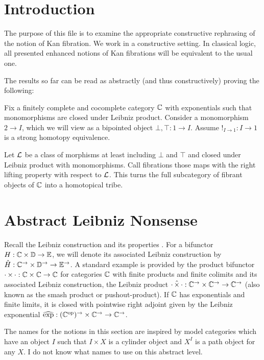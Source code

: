 \documentclass[reqno,10pt,a4paper,oneside]{amsart}
\begin{document}
\section{Introduction}

The purpose of this file is to examine the appropriate constructive rephrasing of the notion of Kan fibration.
We work in a constructive setting.
In classical logic, all presented enhanced notions of Kan fibrations will be equivalent to the usual one. 

The results so far can be read as abstractly (and thus constructively) proving the following:

\begin{theorem}
\label{abstract-homotopical-tribe}
Fix a finitely complete and cocomplete category $\mathbb{C}$ with exponentials such that monomorphisms are closed under Leibniz product.
Consider a monomorphism $2 \to I$, which we will view as a bipointed object $\bot, \top : 1 \to I$.
Assume $!_{I \to 1} : I \to 1$ is a strong homotopy equivalence.

Let $\mathcal{L}$ be a class of morphisms at least including $\bot$ and $\top$ and closed under Leibniz product with monomorphisms.
Call fibrations those maps with the right lifting property with respect to $\mathcal{L}$.
This turns the full subcategory of fibrant objects of $\mathbb{C}$ into a homotopical tribe.
\end{theorem}

\section{Abstract Leibniz Nonsense}

Recall the Leibniz construction and its properties \cite[Section 4]{riehl-verity:reedy}.
For a bifunctor $H : \mathbb{C} \times \mathbb{D} \to \mathbb{E}$, we will denote its associated Leibniz construction by $\hat{H} : \mathbb{C}^{\to} \times \mathbb{D}^{\to} \to \mathbb{E}^{\to}$.
A standard example is provided by the product bifunctor $\mathop{\cdot} \times \mathop{\cdot} : \mathbb{C} \times \mathbb{C} \to \mathbb{C}$ for categories $\mathbb{C}$ with finite products and finite colimits and its associated Leibniz construction, the Leibniz product $\mathop{\cdot} \mathbin{\hat{\times}} \mathop{\cdot} : \mathbb{C}^{\to} \times \mathbb{C}^{\to} \to \mathbb{C}^{\to}$ (also known as the smash product or pushout-product).
If $\mathbb{C}$ has exponentials and finite limits, it is closed with pointwise right adjoint given by the Leibniz exponential $\operatorname{\widehat{exp}} : (\mathbb{C}^{\mathrm{op}})^{\to} \times \mathbb{C}^{\to} \to \mathbb{C}^{\to}$.

The names for the notions in this section are inspired by model categories which have an object $I$ such that $I \times X$ is a cylinder object and $X^I$ is a path object for any $X$.
I do not know what names to use on this abstract level.
\end{document}
